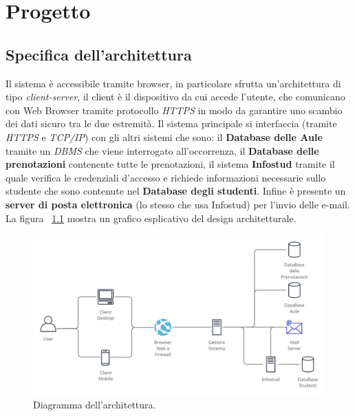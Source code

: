  
\chapter{Progetto}

\section{Specifica dell’architettura}
 Il sistema è accessibile tramite browser, in particolare sfrutta un'architettura di tipo \emph{client-server}, il client è il dispositivo da cui accede l’utente, che comunicano con Web Browser  tramite protocollo \emph{HTTPS} in modo da garantire uno scambio dei dati sicuro tra le due estremità. Il sistema principale si interfaccia (tramite \emph{HTTPS} e \emph{TCP/IP}) con gli altri sistemi che sono: il \textbf{Database delle Aule} tramite un \emph{DBMS} che viene interrogato all’occorrenza, il \textbf{Database delle prenotazioni} contenente tutte le prenotazioni, il sistema \textbf{Infostud} tramite il quale verifica le credenziali d’accesso e richiede informazioni  necessarie sullo studente che sono contenute nel  \textbf{Database degli studenti}. Infine è presente un \textbf{server di posta elettronica} (lo stesso che usa Infostud) per l’invio delle e-mail. La figura ~\ref{figura: digramma architetturale} mostra un grafico esplicativo del design architetturale.
 
 \begin{figure}[H]
\begin{center}	
  \includegraphics[width=1 \textwidth]{Figure/diagramma architetturale.jpg}
    \caption{Diagramma dell’architettura.}\label{figura: digramma architetturale}
\end{center}
\end{figure}



